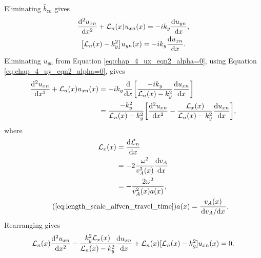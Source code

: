 Eliminating $\hat{b}_{zn}$ gives
\begin{gather}
    \label{eq:chap_4_ux_eqn2_alpha=0}
    \dv[2]{u_{xn}}{x}+\mathcal{L}_n(x)u_{xn}(x)=-ik_y\dv{u_{yn}}{x},\\
    \label{eq:chap_4_uy_eqn2_alpha=0}
    \qty[\mathcal{L}_n(x)-k_y^2]u_{yn}(x)=-ik_y\dv{u_{xn}}{x}.
\end{gather}
Eliminating $u_{yn}$ from Equation \eqref{eq:chap_4_ux_eqn2_alpha=0}, using Equation \eqref{eq:chap_4_uy_eqn2_alpha=0}, gives
\[
    \begin{aligned}
    \dv[2]{u_{xn}}{x}+\mathcal{L}_n(x)u_{xn}(x)&=-ik_y\dv{}{x}\qty[\frac{-ik_y}{\mathcal{L}_n(x)-k_y^2}\dv{u_{xn}}{x}] \\
    &=\frac{-k_y^2}{\mathcal{L}_n(x)-k_y^2}\qty[\dv[2]{u_{xn}}{x}-\frac{\mathcal{L}_x(x)}{\mathcal{L}_n(x)-k_y^2}\dv{u_{xn}}{x}],
    \end{aligned}
\]
where
\begin{gather}
\begin{aligned}
    \mathcal{L}_x(x) &= \dv{\mathcal{L}_n}{x} \\
    &= -2\frac{\omega^2}{v_A^3(x)}\dv{v_A}{x} \\
    &= -\frac{2\omega^2}{v_A^2(x)a(x)},
\end{aligned} \\
    \tag{\ref{eq:length_scale_alfven_travel_time}}
    a(x) = \frac{v_A(x)}{\dv*{v_A}{x}}.
\end{gather}
Rearranging gives
\begin{equation}
    \label{eq:uxn_ode1}
    \mathcal{L}_n(x)\dv[2]{u_{xn}}{x}-\frac{k_y^2\mathcal{L}_x(x)}{\mathcal{L}_n(x)-k_y^2}\dv{u_{xn}}{x}+\mathcal{L}_n(x)[\mathcal{L}_n(x)-k_y^2]u_{xn}(x)=0.
\end{equation}

